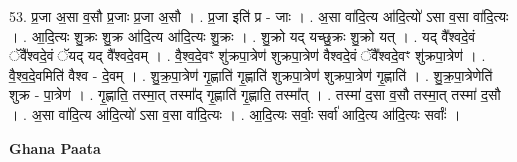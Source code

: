 \documentclass[17pt]{extarticle}
\begin{document}
53. प्र॒जा अ॒सा व॒सौ प्र॒जाः प्र॒जा अ॒सौ । . प्र॒जा इति॑ प्र - जाः । . अ॒सा वा॑दि॒त्य आ॑दि॒त्यो॑ ऽसा व॒सा वा॑दि॒त्यः । . आ॒दि॒त्यः शु॒क्रः शु॒क्र आ॑दि॒त्य आ॑दि॒त्यः शु॒क्रः । . शु॒क्रो यद् यच्छु॒क्रः शु॒क्रो यत् । . यद् वै᳚श्वदे॒वं ॅवै᳚श्वदे॒वं ॅयद् यद् वै᳚श्वदे॒वम् । . वै॒श्व॒दे॒वꣳ शु॑क्रपा॒त्रेण॑ शुक्रपा॒त्रेण॑ वैश्वदे॒वं ॅवै᳚श्वदे॒वꣳ शु॑क्रपा॒त्रेण॑ । . वै॒श्व॒दे॒वमिति॑ वैश्व - दे॒वम् । . शु॒क्र॒पा॒त्रेण॑ गृ॒ह्णाति॑ गृ॒ह्णाति॑ शुक्रपा॒त्रेण॑ शुक्रपा॒त्रेण॑ गृ॒ह्णाति॑ । . शु॒क्र॒पा॒त्रेणेति॑ शुक्र - पा॒त्रेण॑ । . गृ॒ह्णाति॒ तस्मा॒त् तस्मा᳚द् गृ॒ह्णाति॑ गृ॒ह्णाति॒ तस्मा᳚त् । . तस्मा॑ द॒सा व॒सौ तस्मा॒त् तस्मा॑ द॒सौ । . अ॒सा वा॑दि॒त्य आ॑दि॒त्यो॑ ऽसा व॒सा वा॑दि॒त्यः । . आ॒दि॒त्यः सर्वाः॒ सर्वा॑ आदि॒त्य आ॑दि॒त्यः सर्वाः᳚ । \newline

\textbf{Ghana Paata } \newline
\end{document}
